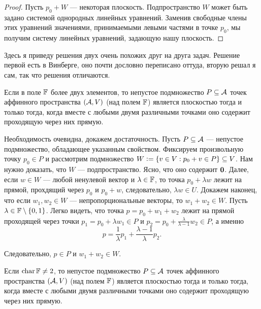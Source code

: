 \begin{proof}
    Пусть $p_0 + W$ --- некоторая плоскость. Подпространство $W$ может быть задано системой однородных линейных уравнений. Заменив свободные члены этих уравнений значениями, принимаемыми левыми частями в точке $p_0$, мы получим систему линейных уравнений, задающую нашу плоскость.
\end{proof}

Здесь я приведу решения двух очень похожих друг на друга задач. Решение первой есть в Винберге, оно почти дословно переписано оттуда, вторую решал я сам, так что решения отличаются.

\begin{problem}[Из Винберга]
    Если в поле $\mathbb{F}$ более двух элементов, то непустое подмножество $P \subseteq \mathcal{A}$ точек аффинного пространства $(\mathcal{A}, V)$ (над полем $\mathbb{F}$) является плоскостью тогда и только тогда, когда вместе с любыми двумя различными точками оно содержит проходящую через них прямую.
\end{problem}

\begin{solution}
    Необходимость очевидна, докажем достаточность. Пусть $P \subseteq \mathcal{A}$ --- непустое подмножество, обладающее указанным свойством. Фиксируем произвольную точку $p_0 \in P$ и рассмотрим подмножество $W \vcentcolon = \{v \in V : p_0 + v \in P\} \subseteq V$. Нам нужно доказать, что $W$ --- подпространство. Ясно, что оно содержит $\boldsymbol{0}$. Далее, если $w \in W$ --- любой ненулевой вектор и $\lambda \in \mathbb{F}$, то точка $p_0 + \lambda w$ лежит на прямой, прохдящий через $p_0$ и $p_0 + w$, следовательно, $\lambda w \in U$. Докажем наконец, что если $w_1, w_2 \in W$ --- непропорциональные векторы, то $w_1 + w_2 \in W$. Пусть $\lambda \in \mathbb{F} \setminus \{0, 1\}$. Легко видеть, что точка $p = p_0 + w_1 + w_2$ лежит на прямой проходящей через точки $p_1 = p_0 + \lambda w_1 \in P$ и $p_2 = p_0 + \frac{\lambda}{\lambda - 1}w_2 \in P$, а именно
    \[
        p = \frac{1}{\lambda}p_1 + \frac{\lambda - 1}{\lambda}p_2.
    \]

    Следовательно, $p \in P$ и $w_1 + w_2 \in W$.
\end{solution}

\begin{problem}[А.\,А. Клячко]
    Если $\operatorname{char}\mathbb{F} \ne 2$, то непустое подмножество $P \subseteq \mathcal{A}$ точек аффинного пространства $(\mathcal{A}, V)$ (над полем $\mathbb{F}$) является плоскостью тогда и только тогда, когда вместе с любыми двумя различными точками оно содержит проходящую через них прямую.
\end{problem}

